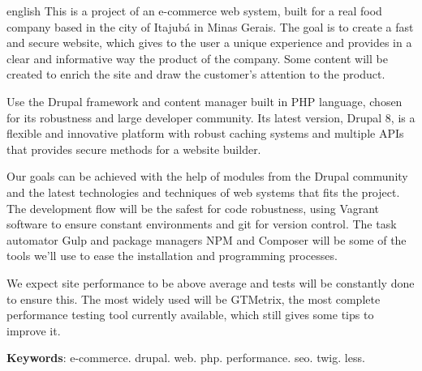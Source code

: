 
\begin{otherlanguage*}{english}
  This is a project of an e-commerce web system, built for a real food company based in the city of Itajubá in Minas Gerais. The goal is to create a fast and secure website, which gives to the user a unique experience and provides in a clear and informative way the product of the company. Some content will be created to enrich the site and draw the customer's attention to the product.

  Use the Drupal framework and content manager built in PHP language, chosen for its robustness and large developer community. Its latest version, Drupal 8, is a flexible and innovative platform with robust caching systems and multiple APIs that provides secure methods for a website builder.

  Our goals can be achieved with the help of modules from the Drupal community and the latest technologies and techniques of web systems that fits the project. The development flow will be the safest for code robustness, using Vagrant software to ensure constant environments and git for version control. The task automator Gulp and package managers NPM and Composer will be some of the tools we'll use to ease the installation and programming processes.

  We expect site performance to be above average and tests will be constantly done to ensure this. The most widely used will be GTMetrix, the most complete performance testing tool currently available, which still gives some tips to improve it.
  
  \vspace{\onelineskip}

  \noindent
  \textbf{Keywords}: e-commerce. drupal. web. php. performance. seo. twig. less.
\end{otherlanguage*}
